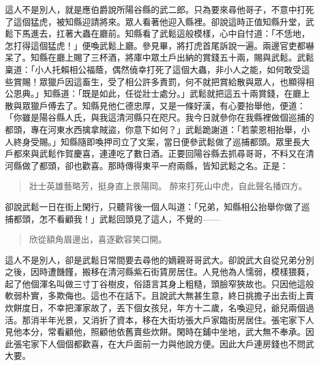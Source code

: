 這人不是別人，就是應伯爵說所陽谷縣的武二郎。只為要來尋他哥子，不意中打死了這個猛虎，被知縣迎請將來。眾人看著他迎入縣裡。卻說這時正值知縣升堂，武鬆下馬進去，扛著大蟲在廳前。知縣看了武鬆這般模樣，心中自忖道：「不恁地，怎打得這個猛虎！」便喚武鬆上廳。參見畢，將打虎首尾訴說一遍。兩邊官吏都嚇呆了。知縣在廳上賜了三杯酒，將庫中眾土戶出納的賞錢五十兩，賜與武鬆。武鬆稟道：「小人托賴相公福蔭，偶然僥幸打死了這個大蟲，非小人之能，如何敢受這些賞賜！眾獵戶因這畜生，受了相公許多責罰，何不就把賞給散與眾人，也顯得相公恩典。」知縣道：「既是如此，任從壯士處分。」武鬆就把這五十兩賞錢，在廳上散與眾獵戶傅去了。知縣見他仁德忠厚，又是一條好漢，有心要抬舉他，便道：「你雖是陽谷縣人氏，與我這清河縣只在咫尺。我今日就參你在我縣裡做個巡捕的都頭，專在河東水西擒拿賊盜，你意下如何？」武鬆跪謝道：「若蒙恩相抬舉，小人終身受賜。」知縣隨即喚押司立了文案，當日便參武鬆做了巡捕都頭。眾里長大戶都來與武鬆作賀慶喜，連連吃了數日酒。正要回陽谷縣去抓尋哥哥，不料又在清河縣做了都頭，卻也歡喜。那時傳得東平一府兩縣，皆知武鬆之名。正是：
\begin{quote}
壯士英雄藝略芳，挺身直上景陽岡。
醉來打死山中虎，自此聲名播四方。
\end{quote}

卻說武鬆一日在街上閑行，只聽背後一個人叫道：「兄弟，知縣相公抬舉你做了巡捕都頭，怎不看顧我！」武鬆回頭見了這人，不覺的——
\begin{quote}
欣從額角眉邊出，喜逐歡容笑口開。
\end{quote}

這人不是別人，卻是武鬆日常間要去尋他的嫡親哥哥武大。卻說武大自從兄弟分別之後，因時遭饑饉，搬移在清河縣紫石街賃房居住。人見他為人懦弱，模樣猥蕤，起了他個渾名叫做三寸丁谷樹皮，俗語言其身上粗糙，頭臉窄狹故也。只因他這般軟弱朴實，多欺侮也。這也不在話下。且說武大無甚生意，終日挑擔子出去街上賣炊餅度日，不幸把渾家故了，丟下個女孩兒，年方十二歲，名喚迎兒，爺兒兩個過活。那消半年光景，又消折了資本，移在大街坊張大戶家臨街房居住。張宅家下人見他本分，常看顧他，照顧他依舊賣些炊餅。閑時在鋪中坐地，武大無不奉承。因此張宅家下人個個都歡喜，在大戶面前一力與他說方便。因此大戶連房錢也不問武大要。

